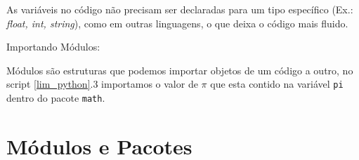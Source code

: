             As variáveis no código não precisam ser declaradas para um 
            tipo específico (Ex.: \textit{float, int, string}), como em outras linguagens, o que deixa o código mais fluido. 
            \begin{quote}
            
                                                       
            \end{quote}
            
            Importando Módulos:
            
            Módulos são estruturas que podemos importar objetos de um código a outro,
            no script \ref{lim_python}.3 importamos o valor de $\pi$ que esta contido na variável \verb|pi| dentro do pacote \verb|math|. 
            
            \begin{quote}
                                                        
            \end{quote}
            
        \section{Módulos e Pacotes}
            
